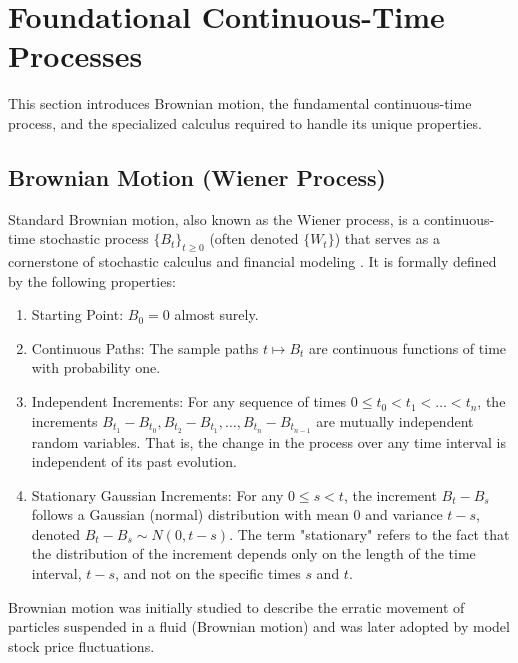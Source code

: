 \documentclass[11pt,twoside,openright]{report}
\begin{document}
\section{Foundational Continuous-Time Processes}
\label{sec:brownian_ito}

This section introduces Brownian motion, the fundamental continuous-time process, and the specialized calculus required to handle its unique properties.

\subsection{Brownian Motion (Wiener Process)}
\label{subsec:brownian_motion}

Standard Brownian motion, also known as the Wiener process, is a continuous-time stochastic process $\{B_t\}_{t \ge 0}$ (often denoted $\{W_t\}$) that serves as a cornerstone of stochastic calculus and financial modeling \cite{revuz1999continuous}. It is formally defined by the following properties:
\begin{enumerate}
    \item Starting Point: $B_0 = 0$ almost surely.
    \item Continuous Paths: The sample paths $t \mapsto B_t$ are continuous functions of time with probability one.
    \item Independent Increments: For any sequence of times $0 \le t_0 < t_1 < \dots < t_n$, the increments $B_{t_1} - B_{t_0}, B_{t_2} - B_{t_1}, \dots, B_{t_n} - B_{t_{n-1}}$ are mutually independent random variables. That is, the change in the process over any time interval is independent of its past evolution.
    \item Stationary Gaussian Increments: For any $0 \le s < t$, the increment $B_t - B_s$ follows a Gaussian (normal) distribution with mean 0 and variance $t-s$, denoted $B_t - B_s \sim N(0, t-s)$. The term "stationary" refers to the fact that the distribution of the increment depends only on the length of the time interval, $t-s$, and not on the specific times $s$ and $t$.
\end{enumerate}
Brownian motion was initially studied to describe the erratic movement of particles suspended in a fluid (Brownian motion) and was later adopted by \cite{bachelier1900theorie} model stock price fluctuations.
\end{document}
